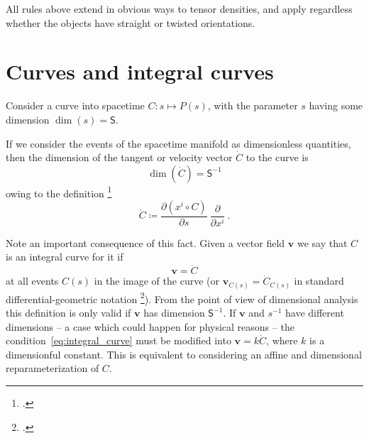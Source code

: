 \documentclass[\ifafour a4paper,12pt,\else a5paper,10pt,\fi%
onecolumn,oneside,article,%
british%
]{memoir}
\newcommand*{\defquote}[1]{`#1'}
\theoremstyle{remark}
\theoremstyle{innote}
\newcommand*{\citep}{\footcites}
\newcommand*{\de}{\partialup}%
\newcommand*{\defd}{\coloneqq}
\renewcommand*{\|}[1][]{\nonscript\,#1\vert\nonscript\;\mathopen{}}
\newcommand*{\sect}{\S}%
\newcommand*{\chap}{ch.}%
\newcommand*{\Ss}{\textsf{S}}
\newcommand*{\yv}{\bm{v}}
\newcommand*{\dex}[1][i]{\frac{\de}{\de x^{#1}}}
\newcommand*{\yC}{\dot{C}}
\begin{document}
\medskip


All rules above extend in obvious ways to tensor densities, and apply
regardless whether the objects have straight or twisted orientations.



\section{Curves and integral curves}
\label{sec:curves}


Consider a curve into spacetime $C\colon s \mapsto P(s)$, with the
parameter $s$ having some dimension $\dim(s)=\Ss$.


If we consider the events of the spacetime manifold as dimensionless
quantities, then the dimension of the tangent or velocity vector $\yC$
to the curve is
\begin{equation}
  \label{eq:dim_velocity}
  \dim(\yC) = \Ss^{-1} 
\end{equation}
owing to the definition
\citep[\sect~III.B.1]{choquetbruhatetal1977_r1996}[\sect~IV.(1.9)]{boothby1975_r2003}
\begin{equation}
  \label{eq:def_tangent_curve}
\yC \defd \frac{\de (x^{i} \circ C)}{\de s}\ \dex \ .
\end{equation}

Note an important consequence of this fact. Given a vector field $\yv$ we
say that $C$ is an integral curve for it if
\begin{equation}
  \yv = \yC
  \label{eq:integral_curve}
\end{equation}
at all events $C(s)$ in the image of the curve (or
$\yv_{C(s)} = \yC_{C(s)}$ in standard differential-geometric notation
\citep[\sect~III.B.1]{choquetbruhatetal1977_r1996}). From the point of view
of dimensional analysis this definition is only valid if $\yv$ has
dimension $\Ss^{-1}$. If $\yv$ and $s^{-1}$ have different dimensions -- a
case which could happen for physical reasons -- the
condition~\eqref{eq:integral_curve} must be modified into $\yv = k\yC$,
where $k$ is a dimensionful constant. This is equivalent to considering an
affine and dimensional reparameterization of $C$.
\end{document}
